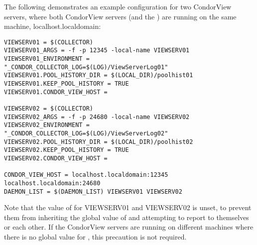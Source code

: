 The following demonstrates an example configuration for two CondorView servers,
where both CondorView servers (and the ) are running on the
same machine, localhost.localdomain:

\footnotesize
\begin{verbatim}
VIEWSERV01 = $(COLLECTOR)
VIEWSERV01_ARGS = -f -p 12345 -local-name VIEWSERV01
VIEWSERV01_ENVIRONMENT = "_CONDOR_COLLECTOR_LOG=$(LOG)/ViewServerLog01"
VIEWSERV01.POOL_HISTORY_DIR = $(LOCAL_DIR)/poolhist01
VIEWSERV01.KEEP_POOL_HISTORY = TRUE
VIEWSERV01.CONDOR_VIEW_HOST =

VIEWSERV02 = $(COLLECTOR)
VIEWSERV02_ARGS = -f -p 24680 -local-name VIEWSERV02
VIEWSERV02_ENVIRONMENT = "_CONDOR_COLLECTOR_LOG=$(LOG)/ViewServerLog02"
VIEWSERV02.POOL_HISTORY_DIR = $(LOCAL_DIR)/poolhist02
VIEWSERV02.KEEP_POOL_HISTORY = TRUE
VIEWSERV02.CONDOR_VIEW_HOST =

CONDOR_VIEW_HOST = localhost.localdomain:12345 localhost.localdomain:24680
DAEMON_LIST = $(DAEMON_LIST) VIEWSERV01 VIEWSERV02
\end{verbatim}
\normalsize

Note that the value of  for VIEWSERV01 and VIEWSERV02
is unset, to prevent them from inheriting the global value of
 and attempting to report to themselves 
or each other.  If the CondorView servers are running on different machines where
there is no global value for , this precaution
is not required.
